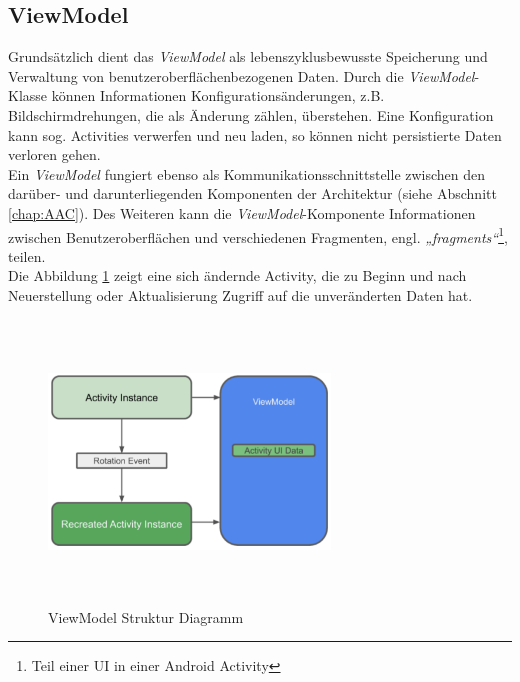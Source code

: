 \subsection*{ViewModel}
\label{sec:ViewModel}
Grundsätzlich dient das \textit{ViewModel} als lebenszyklusbewusste Speicherung und Verwaltung von benutzeroberflächenbezogenen Daten. 
Durch die \textit{ViewModel}-Klasse können Informationen Konfigurationsänderungen, z.B. Bildschirmdrehungen, die als Änderung zählen, 
überstehen. Eine Konfiguration kann sog. Activities verwerfen und neu laden, so können nicht persistierte Daten verloren gehen. \cite{viewModelAndroid.2020}
\\ 
\linebreak
Ein \textit{ViewModel} fungiert ebenso als Kommunikationsschnittstelle zwischen den darüber- und darunterliegenden Komponenten der 
Architektur (siehe Abschnitt \ref{chap:AAC}). Des Weiteren kann die \textit{ViewModel}-Komponente Informationen zwischen Benutzeroberflächen 
und verschiedenen Fragmenten, engl. \textit{„fragments“}\footnote{Teil einer \ac{UI} in einer Android Activity}, teilen.
\\ 
Die Abbildung \ref{pic:viewModeldiagramm} zeigt eine sich ändernde Activity, die zu Beginn und nach Neuerstellung oder Aktualisierung Zugriff 
auf die unveränderten Daten hat. 
\begin{figure}[hbt!]
    \centering
    \includegraphics[width=7.5cm,height=7.5cm,keepaspectratio]{2Grundlagen/Bilder/viewModelDiagram.png}
    \caption{ViewModel Struktur Diagramm \cite{viewmodeldiagr.2020}}
    \label{pic:viewModeldiagramm}
\end{figure} 
